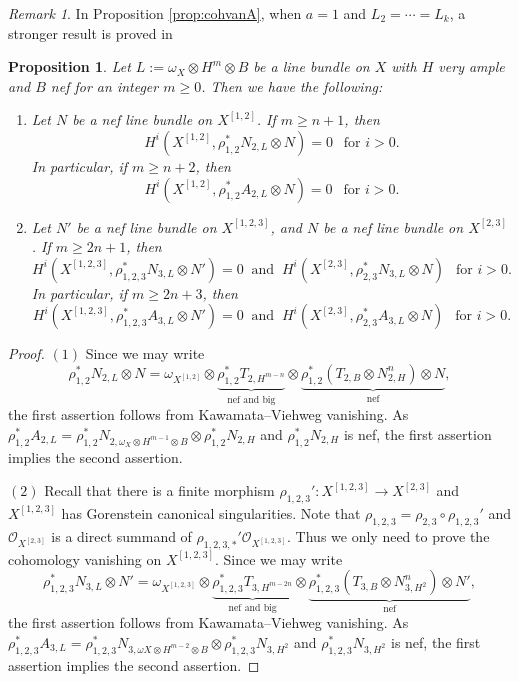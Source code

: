 \documentclass{amsart}
\theoremstyle{plain}
\newtheorem{prop}[thm]{Proposition}
\theoremstyle{definition}
\theoremstyle{remark}
\newtheorem{rem}[thm]{Remark}
\begin{document}
\begin{rem}
In Proposition \ref{prop:cohvanA}, when $a=1$ and $L_2 = \cdots = L_k$, 
a stronger result is proved in \cite[Theorem 2.1]{Ein.Lazarsfeld.93}  
\end{rem}

\begin{prop}\label{prop:cohvanB}
Let $L:=\omega_X \otimes H^m \otimes B$ be a line bundle on $X$ with $H$ very ample and $B$ nef for an integer $m \geq 0$. Then we have the following:
\begin{enumerate}
    \item Let $N$ be a nef line bundle on $X^{[1,2]}$. If $m \geq n+1$, then 
    $$
    H^i(X^{[1,2]}, \rho_{1,2}^* N_{2,L} \otimes N)=0~~\text{ for $i>0$}.
    $$
    In particular, if $m \geq n+2$, then 
    $$
     H^i(X^{[1,2]}, \rho_{1,2}^* A_{2,L} \otimes N)=0~~\text{ for $i>0$}.
    $$
    \item Let $N'$ be a nef line bundle on $X^{[1,2,3]}$, and $N$ be a nef line bundle on $X^{[2,3]}$. If $m  \geq 2n+1$, then 
    $$
    H^i(X^{[1,2,3]}, \rho_{1,2,3}^* N_{3,L} \otimes N')=0~\text{ and }~H^i(X^{[2,3]}, \rho_{2,3}^* N_{3,L} \otimes N)~~\text{ for $i>0$}.
    $$
    In particular, if $m \geq 2n+3$, then 
    $$
    H^i(X^{[1,2,3]}, \rho_{1,2,3}^* A_{3,L} \otimes N')=0~\text{ and }~H^i(X^{[2,3]}, \rho_{2,3}^* A_{3,L} \otimes N)~~\text{ for $i>0$}.
    $$
\end{enumerate}
\end{prop}

\begin{proof}
$(1)$ Since we may write
$$
\rho_{1,2}^* N_{2,L} \otimes N = \omega_{X^{[1,2]}} \otimes \underbrace{\rho_{1,2}^* T_{2,H^{m-n}}}_{\text{nef and big}}  \otimes  \underbrace{\rho_{1,2}^* (T_{2, B} \otimes N_{2,H}^n)  \otimes N}_{\text{nef}},
$$
the first assertion follows from Kawamata--Viehweg vanishing. As $\rho_{1,2}^* A_{2,L} = \rho_{1,2}^* N_{2, \omega_X \otimes H^{m-1} \otimes B} \otimes \rho_{1,2}^* N_{2, H}$ and $\rho_{1,2}^* N_{2, H}$ is nef, the first assertion implies the second assertion. 

\medskip

\noindent $(2)$ Recall that there is a finite morphism $\rho_{1,2,3}' \colon X^{[1,2,3]} \to X^{[2,3]}$ and $X^{[1,2,3]}$ has Gorenstein canonical singularities. Note that $\rho_{1,2,3} = \rho_{2,3} \circ \rho_{1,2,3}'$ and $\mathcal{O}_{X^{[2,3]}}$ is a direct summand of $\rho_{1,2,3,*}' \mathcal{O}_{X^{[1,2,3]}}$. Thus we only need to prove the cohomology vanishing on $X^{[1,2,3]}$. Since we may write
$$
\rho_{1,2,3}^* N_{3, L} \otimes N' = \omega_{X^{[1,2,3]}} \otimes \underbrace{\rho_{1,2,3}^* T_{3, H^{m-2n}}}_{\text{nef and big}} \otimes \underbrace{\rho_{1,2,3}^* (T_{3, B} \otimes N_{3, H^{2}}^n) \otimes N'}_{\text{nef}},
$$
the first assertion follows from Kawamata--Viehweg vanishing. As $\rho_{1,2,3}^* A_{3, L} = \rho_{1,2,3}^* N_{3, \omega X \otimes H^{m-2} \otimes B} \otimes \rho_{1,2,3}^* N_{3, H^2}$ and $\rho_{1,2,3}^* N_{3, H^2}$ is nef, the first assertion implies the second assertion. 
\end{proof}
\end{document}
